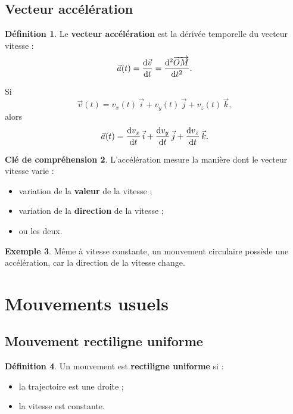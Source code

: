 \documentclass[11pt,a4paper]{article}
\theoremstyle{definition}
\newtheorem{definition}{Définition}[section]
\newtheorem{exemple}[definition]{Exemple}
\newtheorem{interpretation}[definition]{Clé de compréhension}
\theoremstyle{plain}
\theoremstyle{remark}
\newcommand{\OM}{\overrightarrow{OM}}
\begin{document}
\subsection{Vecteur accélération}

\begin{definition}
Le \textbf{vecteur accélération} est la dérivée temporelle du vecteur vitesse :
\[
\vec{a}(t)=\dv{\vec{v}}{t}=\dv[2]{\OM}{t}.
\]
\end{definition}

Si
\[
\vec{v}(t)=v_x(t)\,\vec{i}+v_y(t)\,\vec{j}+v_z(t)\,\vec{k},
\]
alors
\[
\vec{a}(t)=\dv{v_x}{t}\,\vec{i}+\dv{v_y}{t}\,\vec{j}+\dv{v_z}{t}\,\vec{k}.
\]

\begin{interpretation}
L'accélération mesure la manière dont le vecteur vitesse varie :
\begin{itemize}
    \item variation de la \textbf{valeur} de la vitesse ;
    \item variation de la \textbf{direction} de la vitesse ;
    \item ou les deux.
\end{itemize}
\end{interpretation}

\begin{exemple}
Même à vitesse constante, un mouvement circulaire possède une accélération, car la direction de la vitesse change.
\end{exemple}

\section{Mouvements usuels}

\subsection{Mouvement rectiligne uniforme}

\begin{definition}
Un mouvement est \textbf{rectiligne uniforme} si :
\begin{itemize}
    \item la trajectoire est une droite ;
    \item la vitesse est constante.
\end{itemize}
\end{definition}
\end{document}
